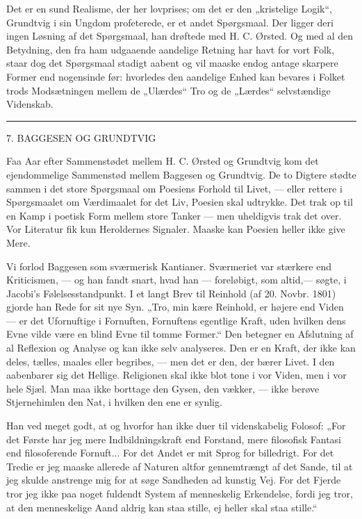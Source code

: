 \documentclass[12pt,a4paper,openany]{book}
\newcommand{\opage}[1]{\marginnote{\footnotesize\textit{[#1]}}}
\begin{document}
Det er en sund Realisme, der her lovprises; om det er den „kristelige Logik“,
Grundtvig i sin Ungdom profeterede, er et andet Spørgsmaal. Der ligger deri
ingen Løsning af det Spørgsmaal, han drøftede med H. C. Ørsted. Og med al den
Betydning, den fra ham udgaaende aandelige Retning har havt for vort Folk,
staar dog det Spørgsmaal stadigt aabent og vil maaske endog antage skarpere
Former end nogensinde før: hvorledes den aandelige Enhed kan bevares i Folket
trods Modsætningen mellem de „Ulærdes“ Tro og de „Lærdes“ selvstændige Videnskab.

\begin{center}\rule{2cm}{0.4pt}\end{center}

\setcounter{footnote}{0}%
\opage{66}

\begin{center}\large 7. BAGGESEN OG GRUNDTVIG\end{center}

Faa Aar efter Sammenstødet mellem H. C. Ørsted og Grundtvig kom det
ejendommelige Sammenstød mellem Baggesen og Grundtvig. De to Digtere stødte
sammen i det store Spørgsmaal om Poesiens Forhold til Livet, --- eller rettere
i Spørgsmaalet om Værdimaalet for det Liv, Poesien skal udtrykke. Det trak op
til en Kamp i poetisk Form mellem store Tanker --- men uheldigvis trak det
over. Vor Literatur fik kun Heroldernes Signaler. Maaske kan Poesien heller
ikke give Mere.

Vi forlod Baggesen som sværmerisk Kantianer. Sværmeriet var stærkere end
Kriticismen, --- og han fandt snart, hvad han --- foreløbigt, som altid,---
søgte, i Jacobi's Følelsesstandpunkt. I et langt Brev til Reinhold (af 20.
Novbr. 1801) gjorde han Rede for sit nye Syn. „Tro, min kære Reinhold, er
højere end Viden --- er det Ufornuftige i Fornuften, Fornuftens egentlige
Kraft, uden hvilken dens Evne vilde være en blind Evne til tomme Former.“ Den
betegner en Afslutning af al Reflexion og Analyse og kan ikke selv analyseres.
Den er en Kraft, der ikke kan deles, tælles, maales eller begribes, --- men det
er den, der bærer Livet. I den aabenbarer sig det Hellige. Religionen skal ikke
blot tone i vor Viden, men i vor hele Sjæl. Man maa ikke borttage den Gysen,
den vækker, --- ikke berøve Stjernehimlen den Nat, i hvilken den ene er synlig.

Han ved meget godt, at og hvorfor han ikke duer til videnskabelig Folosof: „For
det Første har jeg mere Indbildningskraft end Forstand, mere filosofisk Fantasi
end filosoferende Fornuft... For det Andet er mit Sprog for billedrigt. For
\setcounter{footnote}{0}%
\opage{67}det Tredie er jeg maaske allerede af Naturen altfor gennemtrængt af
det Sande, til at jeg skulde anstrenge mig for at søge Sandheden ad kunstig
Vej. For det Fjerde tror jeg ikke paa noget fuldendt System af menneskelig
Erkendelse, fordi jeg tror, at den menneskelige Aand aldrig kan staa stille, ej
heller skal staa stille.“
\end{document}
